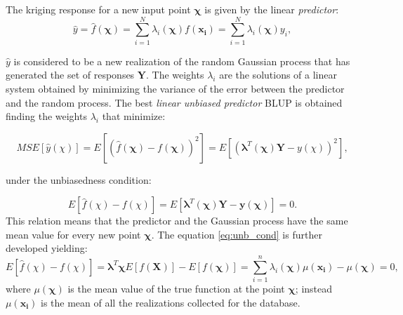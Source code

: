The kriging response for a new input point $\boldsymbol{\chi}$ is given by the linear \textit{predictor}:
\begin{equation}
\hat{y} = \hat{f}(\boldsymbol{\chi}) = \sum_{i=1}^{N} \lambda_i(\boldsymbol{\chi}) f(\mathbf{x_i}) =  \sum_{i=1}^{N} \lambda_i(\boldsymbol{\chi}) y_i,
\end{equation}

\noindent $\hat{y}$ is considered to be a new realization of the random Gaussian process that has generated the set of responses $\mathbf{Y}$.
The weights $\lambda_i$ are the solutions of a linear system obtained by minimizing the variance of the error between the predictor and the random process.
The best \textit{linear unbiased predictor} BLUP is obtained finding the weights $\lambda_i$ that minimize:

\begin{equation}
MSE[\hat{y}(\chi)] =  E \left[\left( \hat{f}(\boldsymbol{\chi})  -f(\boldsymbol{\chi}) \right)^2\right] = E \left[\left(   \boldsymbol{\lambda}^T(\boldsymbol{\chi})\mathbf{Y} -y(\chi)\right)^2\right],
\label{eq:var_err}
\end{equation}

\noindent under the unbiasedness condition:

\begin{equation}
E \left[ \hat{f}(\chi)  -f(\chi)\right] =  E \left[ \boldsymbol{\lambda}^T(\boldsymbol{\chi})\mathbf{Y} -\mathbf{y}(\boldsymbol{\chi})  \right] = 0.
\label{eq:unb_cond}
\end{equation}
This relation means that the predictor and the Gaussian process have the same mean value for every new point $\boldsymbol{\chi}$. The equation \eqref{eq:unb_cond} is further developed yielding:
\begin{equation}
E \left[ \hat{f}(\chi)  -f(\chi)\right] = \boldsymbol{\lambda}^T \boldsymbol{\chi} E \left[ f(\mathbf{X})  \right] - E \left[ f(\boldsymbol{\chi})  \right] = \sum_{i=1}^{n} \lambda_i(\boldsymbol{\chi}) \mu(\mathbf{x_i}) - \mu(\boldsymbol{\chi}) = 0,
\label{eq:unb_cond2}
\end{equation}
where $\mu(\boldsymbol{\chi})$ is the mean value of the true function at the point $\boldsymbol{\chi}$; instead $\mu(\mathbf{x_i})$ is the mean of all the realizations collected for the database.

